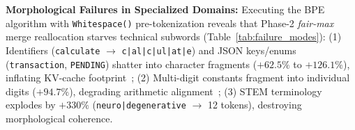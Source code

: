 \textbf{Morphological Failures in Specialized Domains:} Executing the BPE algorithm with \texttt{Whitespace()} pre-tokenization reveals that Phase-2 \textit{fair-max} merge reallocation starves technical subwords (Table~\ref{tab:failure_modes}):
(1) Identifiers (\texttt{calculate} $\rightarrow$ \texttt{c|al|c|ul|at|e}) and JSON keys/enums (\texttt{transaction}, \texttt{PENDING}) shatter into character fragments ($+62.5\%$ to $+126.1\%$), inflating KV-cache footprint~\cite{petrov2023language,ahia2023all};
(2) Multi-digit constants fragment into individual digits ($+94.7\%$), degrading arithmetic alignment~\cite{singh2024tokenization};
(3) STEM terminology explodes by $+330\%$ (\texttt{neuro|degenerative} $\rightarrow$ 12 tokens), destroying morphological coherence.
